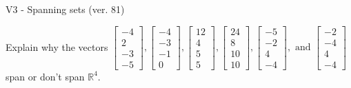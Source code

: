 \begin{exercise}
  \begin{exerciseTitle}V3 - Spanning sets (ver. 81)\end{exerciseTitle}
  \begin{exerciseStatement}
    Explain why the vectors \(\left[\begin{array}{r}
-4 \\
2 \\
-3 \\
-5
\end{array}\right] , \left[\begin{array}{r}
-4 \\
-3 \\
-1 \\
0
\end{array}\right] , \left[\begin{array}{r}
12 \\
4 \\
5 \\
5
\end{array}\right] , \left[\begin{array}{r}
24 \\
8 \\
10 \\
10
\end{array}\right] , \left[\begin{array}{r}
-5 \\
-2 \\
4 \\
-4
\end{array}\right] , \text{ and } \left[\begin{array}{r}
-2 \\
-4 \\
4 \\
-4
\end{array}\right]\) span or don't span \(\mathbb{R}^4\). 
	



\end{exerciseStatement}
\end{exercise}
